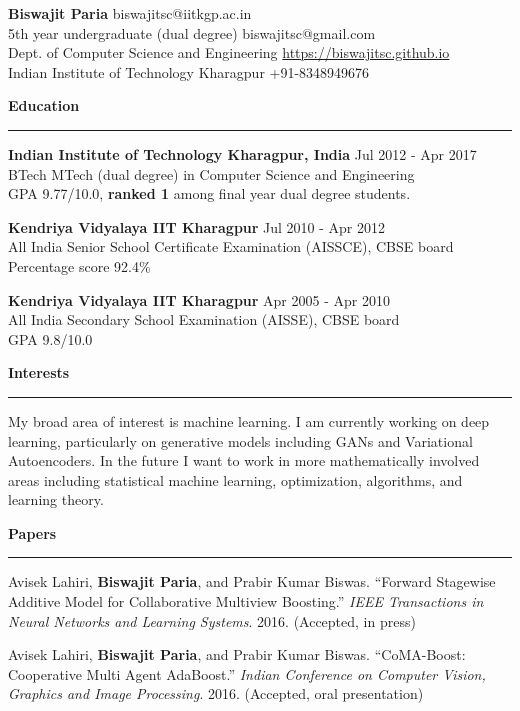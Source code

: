 \documentclass[10pt]{article}
\newcommand{\heading}[1]{
 {\large \textbf{#1}}
  \vspace{0.4em}
  \hrule
  \vspace{0.4em}
}
\newcommand{\EntryGap}{\vspace{0.4	cm}}
\newcommand{\SmallEntryGap}{\vspace{0.2cm}}
\begin{document}

{\Large \textbf{Biswajit Paria}} \hfill biswajitsc@iitkgp.ac.in\\
5th year undergraduate (dual degree) \hfill biswajitsc@gmail.com\\
Dept. of Computer Science and Engineering \hfill \url{https://biswajitsc.github.io}\\
Indian Institute of Technology Kharagpur \hfill  +91-8348949676  
\EntryGap



\heading{Education}

\textbf{Indian Institute of Technology Kharagpur, India} \hfill Jul 2012 - Apr 2017\\
BTech MTech (dual degree) in Computer Science and Engineering\\
GPA 9.77/10.0, \textbf{ranked 1} among final year dual degree students.

\SmallEntryGap
\textbf{Kendriya Vidyalaya IIT Kharagpur} \hfill Jul 2010 - Apr 2012\\
All India Senior School Certificate Examination (AISSCE), CBSE board\\
Percentage score 92.4\%

\SmallEntryGap
\textbf{Kendriya Vidyalaya IIT Kharagpur} \hfill Apr 2005 - Apr 2010\\
All India Secondary School Examination (AISSE), CBSE board\\
GPA 9.8/10.0

\EntryGap
\heading{Interests}

My broad area of interest is machine learning. I am currently working on deep learning,
particularly on generative models including GANs and Variational Autoencoders.
In the future I want to work in more mathematically involved areas including statistical
machine learning, optimization, algorithms, and learning theory.


\EntryGap

\heading{Papers}
  
  Avisek Lahiri, \textbf{Biswajit Paria}, and Prabir Kumar Biswas. 
  ``Forward Stagewise Additive Model for Collaborative Multiview Boosting.''
  \emph{IEEE Transactions in Neural Networks and Learning Systems}. 2016.
  (Accepted, in press)
  
  \SmallEntryGap
  Avisek Lahiri, \textbf{Biswajit Paria}, and Prabir Kumar Biswas.
  ``CoMA-Boost: Cooperative Multi Agent AdaBoost.''
  \emph{Indian Conference on Computer Vision, Graphics and Image Processing}. 2016.
  (Accepted, oral presentation)
  
\end{document}

